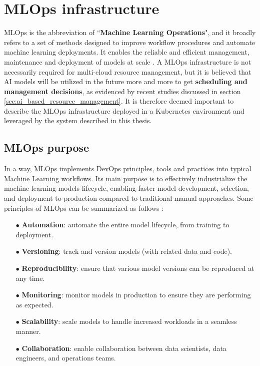 \newpage

\section{MLOps infrastructure}

MLOps is the abbreviation of ``\textbf{Machine Learning Operations}", and it broadly refers to a set of methods designed to improve workflow procedures and automate machine learning deployments. 
It enables the reliable and efficient management, maintenance and deployment of models at scale \cite{mlops_ubuntu}.
A MLOps infrastructure is not necessarily required for multi-cloud resource management, but it is believed that AI models will be utilized in the future more and more to get \textbf{scheduling and management decisions}, as evidenced by recent studies discussed in section \ref{sec:ai_based_resource_management}.
It is therefore deemed important to describe the MLOps infrastructure deployed in a Kubernetes environment and leveraged by the system described in this thesis.

\subsection{MLOps purpose}

In a way, MLOps implements DevOps principles, tools and practices into typical Machine Learning workflows.
Its main purpose is to effectively industrialize the machine learning models lifecycle, enabling faster model development, selection, and deployment to production compared to traditional manual approaches.
Some principles of MLOps can be summarized as follows \cite{mlops_ubuntu}:
\begin{itemize}[itemsep=0.2pt, topsep=1pt]
  \item[$\bullet$] \textbf{Automation}: automate the entire model lifecycle, from training to deployment.
  \item[$\bullet$] \textbf{Versioning}: track and version models (with related data and code).
  \item[$\bullet$] \textbf{Reproducibility}: ensure that various model versions can be reproduced at any time.
  \item[$\bullet$] \textbf{Monitoring}: monitor models in production to ensure they are performing as expected.
  \item[$\bullet$] \textbf{Scalability}: scale models to handle increased workloads in a seamless manner.
  \item[$\bullet$] \textbf{Collaboration}: enable collaboration between data scientists, data engineers, and operations teams.
\end{itemize}

